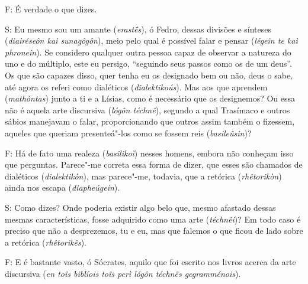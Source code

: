  

\bekker{[266b]} F: É verdade o que dizes.

 

S: Eu mesmo sou um amante (\emph{erastḗs}), ó Fedro, dessas divisões e
sínteses (\emph{diairéseôn kaì sunagôgôn}), meio pelo qual é possível
falar e pensar (\emph{légein te kaì phroneîn}). Se considero qualquer
outra pessoa capaz de observar a natureza do uno e do múltiplo, este eu
persigo, ``seguindo seus passos como os de um deus''. Os que são capazes
disso, quer tenha eu os designado bem ou não, deus o sabe, até agora os
referi como dialéticos (\emph{dialektikoús}). \bekker{[266c]} Mas aos que
aprendem (\emph{mathóntas}) junto a ti e a Lísias, como é necessário que
os designemos? Ou essa não é aquela arte discursiva (\emph{lógôn
téchnê}), segundo a qual Trasímaco e outros sábios manejavam o falar,
proporcionando que outros assim também o fizessem, aqueles que queriam
presenteá"-los como se fossem reis (\emph{basileûsin})? 

F: Há de fato uma realeza (\emph{basilikoì}) nesses homens, embora não
conheçam isso que perguntas. Parece"-me correta essa forma de dizer, que
esses são chamados de dialéticos (\emph{dialektikòn}), mas parece"-me,
todavia, que a retórica (\emph{rhêtorikòn}) ainda nos escapa
(\emph{diapheúgein}).

 

\bekker{[266d]} S: Como dizes? Onde poderia existir algo belo que, mesmo
afastado dessas mesmas características, fosse adquirido como uma arte
(\emph{téchnêi})? Em todo caso é preciso que não a desprezemos, tu e eu,
mas que falemos o que ficou de lado sobre a retórica
(\emph{rhêtorikês}).

 

F: E é bastante vasto, ó Sócrates, aquilo que foi escrito nos livros
acerca da arte discursiva (\emph{en toîs biblíois toîs perì lógôn
téchnês gegramménois}).

 

